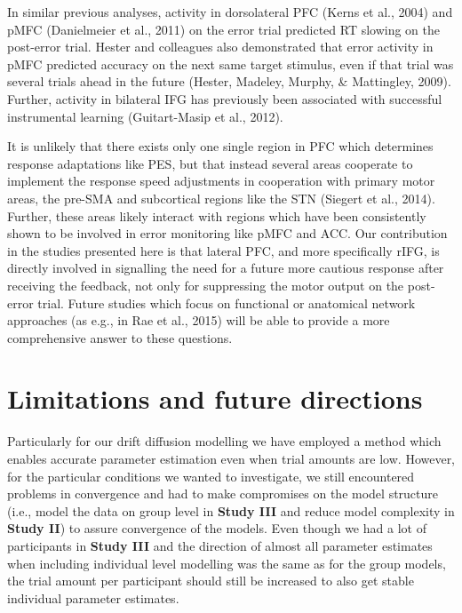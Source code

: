 \documentclass[12pt,openany]{book}
\theoremstyle{definition}
\theoremstyle{definition}
\theoremstyle{definition}
\theoremstyle{remark}
\begin{document}
In similar previous analyses, activity in dorsolateral PFC (Kerns et
al., 2004) and pMFC (Danielmeier et al., 2011) on the error trial
predicted RT slowing on the post-error trial. Hester and colleagues also
demonstrated that error activity in pMFC predicted accuracy on the next
same target stimulus, even if that trial was several trials ahead in the
future (Hester, Madeley, Murphy, \& Mattingley, 2009). Further, activity
in bilateral IFG has previously been associated with successful
instrumental learning (Guitart-Masip et al., 2012).

It is unlikely that there exists only one single region in PFC which
determines response adaptations like PES, but that instead several areas
cooperate to implement the response speed adjustments in cooperation
with primary motor areas, the pre-SMA and subcortical regions like the
STN (Siegert et al., 2014). Further, these areas likely interact with
regions which have been consistently shown to be involved in error
monitoring like pMFC and ACC. Our contribution in the studies presented
here is that lateral PFC, and more specifically rIFG, is directly
involved in signalling the need for a future more cautious response
after receiving the feedback, not only for suppressing the motor output
on the post-error trial. Future studies which focus on functional or
anatomical network approaches (as e.g., in Rae et al., 2015) will be
able to provide a more comprehensive answer to these questions.

\section{Limitations and future
directions}\label{limitations-and-future-directions}

Particularly for our drift diffusion modelling we have employed a method
which enables accurate parameter estimation even when trial amounts are
low. However, for the particular conditions we wanted to investigate, we
still encountered problems in convergence and had to make compromises on
the model structure (i.e., model the data on group level in
\textbf{Study III} and reduce model complexity in \textbf{Study II}) to
assure convergence of the models. Even though we had a lot of
participants in \textbf{Study III} and the direction of almost all
parameter estimates when including individual level modelling was the
same as for the group models, the trial amount per participant should
still be increased to also get stable individual parameter estimates.
\end{document}
